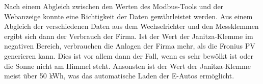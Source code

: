 Nach einem Abgleich zwischen den Werten des Modbus-Tools und der Webanzeige konnte eine Richtigkeit der Daten gewährleistet werden. Aus einem Abgleich der verschiedenen Daten aus dem Wechselrichter und den Messklemmen ergibt sich dann der Verbrauch der Firma. Ist der Wert der Janitza-Klemme im negativen Bereich, verbrauchen die Anlagen der Firma mehr, als die Fronius PV generieren kann. Dies ist vor allem dann der Fall, wenn es sehr bewölkt ist oder die Sonne nicht am Himmel steht. Ansonsten ist der Wert der Janitza-Klemme meist über 50 kWh, was das automatische Laden der E-Autos ermöglicht.


